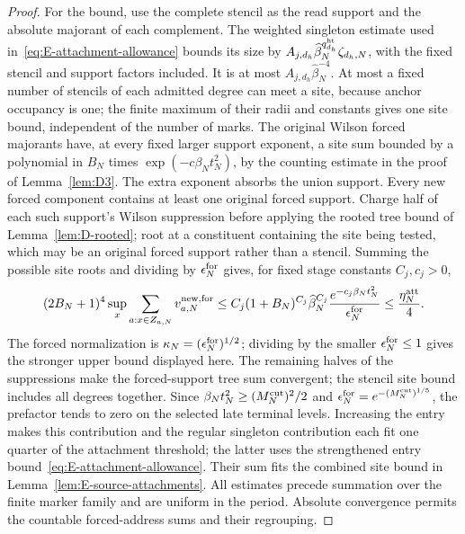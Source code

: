 \begin{proof}
For the bound, use the complete stencil as the read support and the
absolute majorant of each complement. The weighted singleton estimate
used in~\eqref{eq:E-attachment-allowance} bounds its size by
$A_{j,d_h}\widehat\beta_N^{q^{\rm ht}_{d_h}}\zeta_{d_h,N}$, with the
fixed stencil and support factors included. It is at most
$A_{j,d_h}\widehat\beta_N^{-4}$. At most a fixed number of stencils of
each admitted degree can meet a site, because anchor occupancy is one;
the finite maximum of their radii and constants gives one site bound,
independent of the number of marks. The original Wilson forced
majorants have, at every fixed larger support exponent, a site sum
bounded by a polynomial in $B_N$ times $\exp(-c\beta_Nt_N^2)$, by the
counting estimate in the proof of Lemma~\ref{lem:D3}. The extra
exponent absorbs the union support. Every new forced component contains
at least one original forced support. Charge half of each such support's
Wilson suppression before applying the rooted tree bound of
Lemma~\ref{lem:D-rooted}; root at a constituent containing the site
being tested, which may be an original forced support rather than a
stencil. Summing the possible site roots and dividing by
$\epsilon_N^{\rm for}$ gives, for fixed stage constants $C_j,c_j>0$,
\[
 (2B_N+1)^4\sup_x\sum_{a:x\in Z_{a,N}}v^{\rm new,for}_{a,N}
 \le C_j(1+B_N)^{C_j}\widehat\beta_N^{C_j}
 \frac{e^{-c_j\beta_Nt_N^2}}{\epsilon_N^{\rm for}}
 \le\frac{\eta_N^{\rm att}}4.
\]
The forced normalization is $\kappa_N=(\epsilon_N^{\rm for})^{1/2}$;
dividing by the smaller $\epsilon_N^{\rm for}\le1$ gives the stronger
upper bound displayed here.
The remaining halves of the suppressions make the forced-support tree
sum convergent; the stencil site bound includes all degrees together.
Since $\beta_Nt_N^2\ge(M^{\mathrm{cut}}_N)^2/2$ and
$\epsilon_N^{\rm for}=e^{-(M^{\mathrm{cut}}_N)^{1/5}}$, the prefactor tends
to zero on the selected late terminal levels. Increasing the entry makes
this contribution and the regular singleton contribution each fit one
quarter of the attachment threshold; the latter uses the strengthened
entry bound~\eqref{eq:E-attachment-allowance}. Their sum fits the
combined site bound in Lemma~\ref{lem:E-source-attachments}. All
estimates precede summation over the finite marker family and are
uniform in the period. Absolute convergence permits the countable
forced-address sums and their regrouping.
\end{proof}

